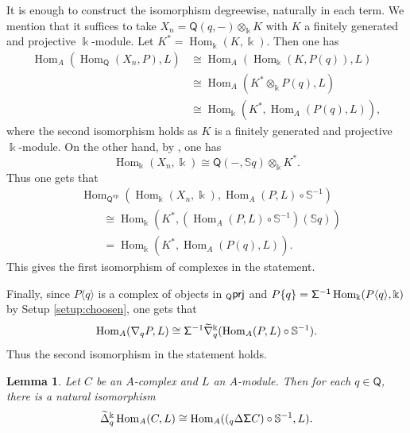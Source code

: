 \documentclass{amsart}
\theoremstyle{bfupright head,slanted body}
\theoremstyle{bfupright head,upright body}
\theoremstyle{fixed bf head,slanted body}
\newtheorem{lem}[res]{Lemma}            \newtheorem*{lem*}{Lemma}
\theoremstyle{fixed bf head,upright body}
\theoremstyle{numbered paragraph}
\newenvironment{prf*}[1][Proof]{%
	\begin{proof}[\bf #1]
		\setcounter{equation}{0}
		\renewcommand{\theequation}{\arabic{equation}}}
	{\end{proof}
}
\numberwithin{equation}{res}
\newcommand{\Hom}{\operatorname{Hom}}
\newcommand{\Q}{\mathsf{Q}}
\newcommand{\kk}{\Bbbk}
\begin{document}
\begin{prf*}
It is enough to construct the isomorphism degreewise, naturally in each term. We mention that it suffices to take $X_n=\Q(q,-)\otimes_{\kk}K$ with $K$ a finitely generated and projective $\kk$-module.
Let $K^*=\Hom_{\kk}(K,\kk)$. Then one has
\begin{align*}
\Hom_A(\Hom_{\Q}(X_n,P),L)
&\cong \Hom_A(\Hom_{\kk}(K,P(q)),L)\\
&\cong \Hom_A(K^*\otimes_\kk P(q),L)\\
&\cong \Hom_{\kk}(K^*,\Hom_A(P(q),L)),
\end{align*}
where the second isomorphism holds as $K$ is a finitely generated and projective $\kk$-module. On the other hand, by \cite[Lemma 1.3$(i)$]{HJ26}, one has
$$\Hom_{\kk}(X_n,\kk)\cong \Q(-,\mathbb S q)\otimes_{\kk}K^*.$$
Thus one gets that
\begin{align*}
&\Hom_{\Q^{\mathrm{op}}}(\Hom_{\kk}(X_n,\kk),
\Hom_A(P,L)\circ\mathbb S^{-1})\\
&\qquad\cong
\Hom_{\kk}(K^*,(\Hom_A(P,L)\circ\mathbb S^{-1})(\mathbb S q))\\
&\qquad=
\Hom_{\kk}(K^*,\Hom_A(P(q),L)).
\end{align*}
This gives the first isomorphism of complexes in the statement.

Finally, since $P\langle q\rangle$ is a complex of objects in ${}_\Q\sf prj$ and $P\{q\}={\sf{\Sigma}^{-1}}\Hom_\kk(P\langle q\rangle,\kk)$ by Setup \ref{setup:choosen}, one gets that
$$\Hom_A(\nabla_qP,L)\cong{\sf\Sigma}^{-1}\widetilde{\nabla}_q^{\kk}
(\Hom_A(P,L)\circ\mathbb S^{-1}).$$
Thus the second isomorphism in the statement holds.
\end{prf*}

\begin{lem}\label{lem:mixed-Hom-transfer}
Let $C$ be an $A$-complex and $L$ an $A$-module. Then for each $q\in\Q$, there is a natural isomorphism
$$\widetilde{\Delta}_q^{\kk}\Hom_A(C,L)\cong
\Hom_A(({}_q\Delta{\sf\Sigma} C)\circ\mathbb S^{-1},L).$$
\end{lem}
\end{document}
